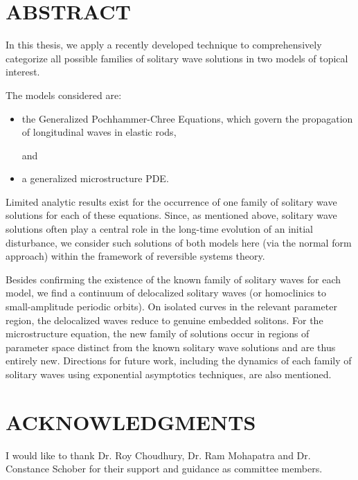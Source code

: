 \chapter*{ABSTRACT}

\indent 

In this thesis, we apply a recently developed technique to
comprehensively categorize all possible families of solitary wave
solutions in two models of topical interest.

The models considered are:
\begin{itemize}
\item the Generalized Pochhammer-Chree Equations, which  govern the propagation of longitudinal waves in elastic rods,

and

\item a generalized microstructure PDE.
\end{itemize}

Limited analytic results exist for the occurrence of one family of  solitary
wave solutions for each of these equations. Since, as mentioned above, solitary
wave solutions often play a central role in the long-time evolution of an
initial disturbance, we consider such solutions of both models here (via the
normal form approach) within the framework of reversible systems theory.

Besides confirming the existence of the known family of solitary waves for each
model, we find a continuum of delocalized solitary waves (or homoclinics to
small-amplitude periodic orbits).  On isolated curves in the relevant parameter
region, the delocalized waves reduce to genuine embedded solitons.  For the
microstructure equation, the new family of solutions occur in regions of
parameter space distinct from the known solitary wave solutions and are thus
entirely new. Directions for future work, including the dynamics of each family of
solitary waves using exponential asymptotics techniques, are also mentioned.



\dedication{
Dedicated To My Family
}



\newpage
{}
\chapter*{ACKNOWLEDGMENTS}

I would like to thank Dr. Roy Choudhury, Dr. Ram Mohapatra and Dr. Constance Schober for their support and guidance as committee members.

\newpage
